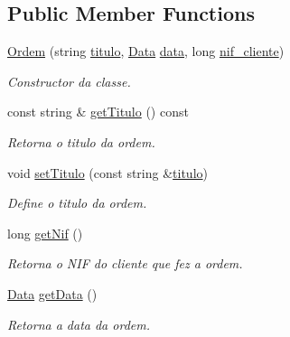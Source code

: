 \subsection*{Public Member Functions}
\begin{DoxyCompactItemize}
\item 
\hyperlink{class_ordem_af1b393aaaec4108c394ee099b8230a10}{Ordem} (string \hyperlink{class_ordem_a0773861bd9fb956d5ec62f2ef1de658b}{titulo}, \hyperlink{class_data}{Data} \hyperlink{class_ordem_a9f4dbc2966e98dcbd7e300ae346d8535}{data}, long \hyperlink{class_ordem_af6d06b4250735ae531bdcef5fa332f02}{nif\+\_\+cliente})
\begin{DoxyCompactList}\small\item\em Constructor da classe. \end{DoxyCompactList}\item 
const string \& \hyperlink{class_ordem_a1382c1e817af7abe07b66be2f3cf4e8d}{get\+Titulo} () const
\begin{DoxyCompactList}\small\item\em Retorna o titulo da ordem. \end{DoxyCompactList}\item 
void \hyperlink{class_ordem_aa8e4bc7713526fe31d8129465e7ff72a}{set\+Titulo} (const string \&\hyperlink{class_ordem_a0773861bd9fb956d5ec62f2ef1de658b}{titulo})
\begin{DoxyCompactList}\small\item\em Define o titulo da ordem. \end{DoxyCompactList}\item 
long \hyperlink{class_ordem_a637e9cd84bc0702bdb3d91e229076f43}{get\+Nif} ()
\begin{DoxyCompactList}\small\item\em Retorna o N\+IF do cliente que fez a ordem. \end{DoxyCompactList}\item 
\hyperlink{class_data}{Data} \hyperlink{class_ordem_ac20855509d9f35a85b1a89f30e2a4cfc}{get\+Data} ()
\begin{DoxyCompactList}\small\item\em Retorna a data da ordem. \end{DoxyCompactList}\end{DoxyCompactItemize}
